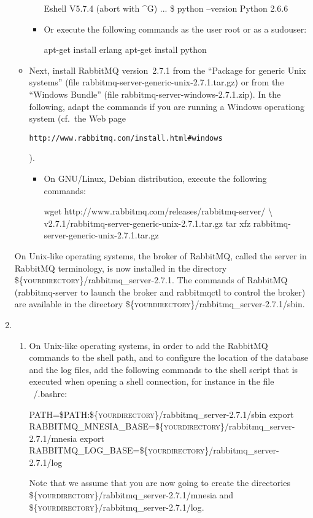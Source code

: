 \begin{enumerate}
\begin{itemize}
\begin{itemize}
\begin{shellcmd}
Eshell V5.7.4  (abort with ^G)
...
\$ python --version
Python 2.6.6
\end{shellcmd}
\item Or execute the following commands as the user \textsf{root} or
  as a \textsf{sudouser}:
\begin{shellcmd}
apt-get install erlang
apt-get install python
\end{shellcmd}
\end{itemize}
\item Next, install \textsf{RabbitMQ} version~2.7.1 from the ``Package
  for generic Unix systems'' (file
  \textsf{rabbitmq-server-generic-unix-2.7.1.tar.gz}) or from the
  ``Windows Bundle'' (file
  \textsf{rabbitmq-server-windows-2.7.1.zip}). In the following, adapt
  the commands if you are running a Windows operationg system (cf.~the
  Web
  page \begin{small}\texttt{http://\-www.\-rabbitmq.\-com/\-install.\-html\#\-windows}\end{small}).
\begin{itemize}
\item On GNU/Linux, Debian distribution, execute the following commands:
\begin{shellcmd}
wget http://www.rabbitmq.com/releases/rabbitmq-server/ \textbackslash
     v2.7.1/rabbitmq-server-generic-unix-2.7.1.tar.gz
tar xfz rabbitmq-server-generic-unix-2.7.1.tar.gz
\end{shellcmd}
\end{itemize}
\end{itemize}
On Unix-like operating systems, the broker of \textsf{RabbitMQ},
called the server in \textsf{RabbitMQ} terminology, is now installed
in the directory
\textsf{\textsc{\$\{yourdirectory\}}/rabbitmq\_server-2.7.1}.  The
commands of \textsf{RabbitMQ} (\textsf{rabbitmq-server} to launch the
broker and \textsf{rabbitmqctl} to control the broker) are available
in the directory
\textsf{\textsc{\$\{yourdirectory\}}/rabbitmq\_server-2.7.1/sbin}.

\item

\begin{enumerate}
\item On Unix-like operating systems, in order to add the
  \textsf{RabbitMQ} commands to the shell path, and to configure the
  location of the database and the log files, add the following
  commands to the shell script that is executed when opening a shell
  connection, for instance in the file \textsf{\string~/.bashrc}:
\begin{shellcmd}
PATH=\${PATH}:\textsc{\$\{yourdirectory\}}/rabbitmq\_server-2.7.1/sbin
export RABBITMQ\_MNESIA\_BASE=\textsc{\$\{yourdirectory\}}/rabbitmq\_server-2.7.1/mnesia
export RABBITMQ\_LOG\_BASE=\textsc{\$\{yourdirectory\}}/rabbitmq\_server-2.7.1/log
\end{shellcmd}
Note that we assume that you are now going to create the directories
\textsf{\textsc{\$\{yourdirectory\}}/rabbitmq\_server-2.7.1/mnesia}
and \textsf{\textsc{\$\{yourdirectory\}}/rabbitmq\_server-2.7.1/log}.


\end{enumerate}
\end{enumerate}
